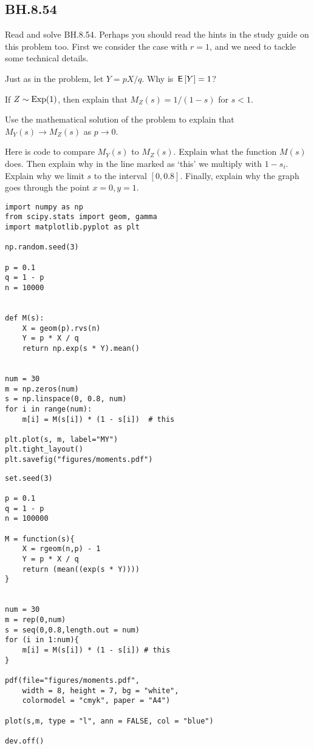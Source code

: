 \subsection{BH.8.54}
\label{sec:bh.8.54}


Read and solve BH.8.54. Perhaps you should read the hints in the study guide on this problem too.
First we consider the case with $r=1$, and we need to tackle some technical details.

\begin{exercise}
Just as in the problem, let $Y=p X/ q$. Why is $\,\mathsf{E}\left[Y\right] = 1$?
\end{exercise}

\begin{exercise}
If $Z\sim\mathrm{Exp}(1)$, then explain that $M_Z(s) = 1/(1-s)$ for $s<1$.
\end{exercise}

\begin{exercise}
Use the mathematical solution of the problem to explain that $M_Y(s)\to M_Z(s)$ as $p\to 0$.
\end{exercise}


\begin{exercise}
Here is code to compare $M_Y(s)$ to $M_{Z}(s)$. Explain what the function $M(s)$ does. Then explain why in the line marked as `this' we multiply with $1-s_{i}$.  Explain why we limit $s$ to the interval $[0, 0.8]$. Finally, explain why the graph goes through the point $x=0, y = 1$.

\begin{verbatim}
import numpy as np
from scipy.stats import geom, gamma
import matplotlib.pyplot as plt

np.random.seed(3)

p = 0.1
q = 1 - p
n = 10000


def M(s):
    X = geom(p).rvs(n)
    Y = p * X / q
    return np.exp(s * Y).mean()


num = 30
m = np.zeros(num)
s = np.linspace(0, 0.8, num)
for i in range(num):
    m[i] = M(s[i]) * (1 - s[i])  # this

plt.plot(s, m, label="MY")
plt.tight_layout()
plt.savefig("figures/moments.pdf")
\end{verbatim}


\begin{verbatim}
set.seed(3)

p = 0.1
q = 1 - p
n = 100000

M = function(s){
    X = rgeom(n,p) - 1
    Y = p * X / q
    return (mean((exp(s * Y))))
}


num = 30
m = rep(0,num)
s = seq(0,0.8,length.out = num)
for (i in 1:num){
    m[i] = M(s[i]) * (1 - s[i]) # this
}

pdf(file="figures/moments.pdf",
    width = 8, height = 7, bg = "white",          
    colormodel = "cmyk", paper = "A4")   

plot(s,m, type = "l", ann = FALSE, col = "blue")

dev.off()
\end{verbatim}
\end{exercise}

